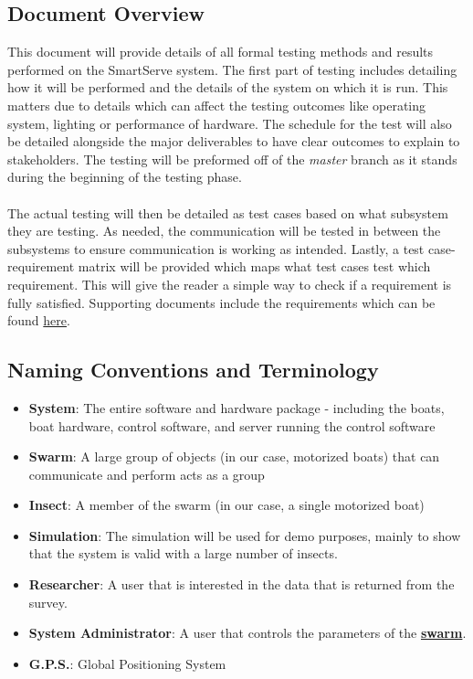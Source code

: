\documentclass[11pt]{article}
\begin{document}
\subsection{Document Overview}
This document will provide details of all formal testing methods and results performed on the SmartServe system. The first part of testing includes detailing how it will be performed and the details of the system on which it is run. This matters due to details which can affect the testing outcomes like operating system, lighting or performance of hardware. The schedule for the test will also be detailed alongside the major deliverables to have clear outcomes to explain to stakeholders. The testing will be preformed off of the \textit{master} branch as it stands during the beginning of the testing phase. \\ \\
The actual testing will then be detailed as test cases based on what subsystem they are testing. As needed, the communication will be tested in between the subsystems to ensure communication is working as intended. Lastly, a test case-requirement matrix will be provided which maps what test cases test which requirement. This will give the reader a simple way to check if a requirement is fully satisfied. Supporting documents include the requirements which can be found \href{https://github.com/ChristopherMcDonald/SoftwareTronCapstone/blob/develop/documentation/Requirements/Requirements.pdf}{here}.

\subsection{Naming Conventions and Terminology}

\label{sec:definitions}
\begin{itemize}
\item \textbf{System}: The entire software and hardware package - including the boats,
boat hardware, control software, and server running the control software
\item \textbf{Swarm}: A large group of objects (in our case, motorized boats) that can communicate and perform acts as a group
\item \textbf{Insect}: A member of the swarm (in our case, a single motorized boat)
\item \textbf{Simulation}: The simulation will be used for demo purposes, mainly to show that
the system is valid with a large number of insects.
\item \textbf{Researcher}: A user that is interested in the data that is returned from the survey.
\item \textbf{System Administrator}: A user that controls the parameters of the \hyperref[sec:definitions]{\textbf{swarm}}.
\item \textbf{G.P.S.}: Global Positioning System
\end{itemize}
\end{document}
